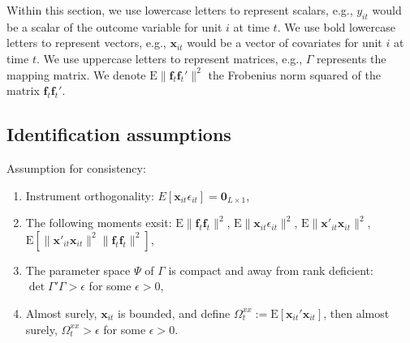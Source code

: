 \documentclass[12pt]{article}
\begin{document}
Within this section, we use lowercase letters to represent scalars, e.g., $y_{it}$ would be a scalar of the outcome variable for unit $i$ at time $t$. We use bold lowercase letters to represent vectors, e.g., $\mathbf{x}_{it}$ would be a vector of covariates for unit $i$ at time $t$. We use uppercase letters to represent matrices, e.g., $\Gamma$ represents the mapping matrix. We denote $\mathrm{E}\|\mathbf{f}_t\mathbf{f}_t'\|^2$ the Frobenius norm squared of the matrix $\mathbf{f}_t\mathbf{f}_t'$.


\subsection{Identification assumptions}

\begin{assumption}
Assumption for consistency:
\begin{enumerate}
    \item Instrument orthogonality: $E\left[\textbf{x}_{it} \epsilon_{it}\right] = \textbf{0}_{L\times 1}$,
    
    \item The following moments exsit: $\mathrm{E}\|\mathbf{f}_{t}\mathbf{f}_{t}\|^2$, $\mathrm{E}\|\mathbf{x}_{it}\epsilon_{it}\|^2$, $\mathrm{E}\|\mathbf{x}'_{it}\mathbf{x}_{it}\|^2$, $\mathrm{E}\left[\|\mathbf{x}'_{it}\mathbf{x}_{it}\|^2\|\mathbf{f}_{t}\mathbf{f}_{t}\|^2 \right]$, 
    
    \item The parameter space $\Psi$ of $\Gamma$ is compact and away from rank deficient: $\det{\Gamma' \Gamma} > \epsilon$ for some $\epsilon>0$,
    
    \item Almost surely, $\mathbf{x}_{it}$ is bounded, and define $\Omega_t^{xx} := \mathrm{E}\left[ \mathbf{x}_{it}' \mathbf{x}_{it} \right]$, then almost surely, $\Omega_t^{xx} > \epsilon$ for some $\epsilon > 0$.
\end{enumerate}
\label{app: ass consistency}
\end{assumption}
\end{document}
